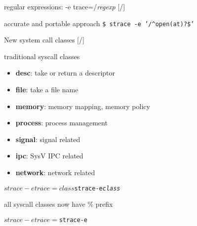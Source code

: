 \documentclass[unicode,aspectratio=169]{beamer}
\begin{document}
\begin{frame}[fragile]{regular expressions: -e trace=/\textit{regexp} \hfill [\insertframenumber/\inserttotalframenumber]}

\begin{block}{\large accurate and portable approach}
\texttt{\$ strace -e '/{\textasciicircum}open(at)?\$'}
\end{block}
\end{frame}

\begin{frame}[fragile]{New system call classes \hfill [\insertframenumber/\inserttotalframenumber]}
\begin{block}{\large traditional syscall classes}
\begin{itemize}
\item \textbf{desc}: take or return a descriptor
\item \textbf{file}: take a file name
\item \textbf{memory}: memory mapping, memory policy
\item \textbf{process}: process management
\item \textbf{signal}: signal related
\item \textbf{ipc}: SysV IPC related
\item \textbf{network}: network related
\end{itemize}
\vspace{-2\topsep}
\begin{alltt}
$ strace -e trace=\textit{class}
$ strace -e \textit{class}
\end{alltt}
\end{block}

\begin{block}{\large all syscall classes now have \% prefix}
\begin{alltt}
$ strace -e trace=%\textit{class}
$ strace -e %\textit{class}
\end{alltt}
\end{block}
\end{frame}
\end{document}

